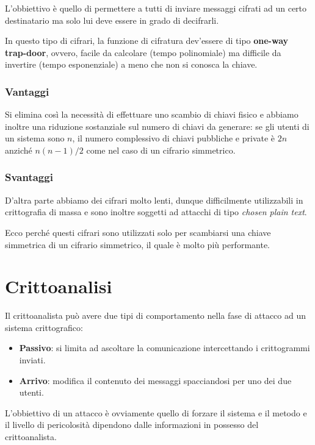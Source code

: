 L'obbiettivo \`e quello di permettere a tutti di inviare messaggi cifrati ad un certo destinatario ma solo lui deve
essere in grado di decifrarli.

In questo tipo di cifrari, la funzione di cifratura dev'essere di tipo \textbf{one-way trap-door}, ovvero, facile da
calcolare (tempo polinomiale) ma difficile da invertire (tempo esponenziale) a meno che non si conosca la chiave.

\subsubsection{Vantaggi}
Si elimina cos\`i la necessit\`a di effettuare uno scambio di chiavi fisico e abbiamo inoltre una riduzione
sostanziale sul numero di chiavi da generare: se gli utenti di un sistema sono $n$, il numero complessivo di chiavi
pubbliche e private \`e $2n$ anzich\'e $n (n-1) / 2$ come nel caso di un cifrario simmetrico.

\subsubsection{Svantaggi}
D'altra parte abbiamo dei cifrari molto lenti, dunque difficilmente utilizzabili in crittografia di massa e sono inoltre
soggetti ad attacchi di tipo \emph{chosen plain text}.

Ecco perch\'e questi cifrari sono utilizzati solo per scambiarsi una chiave simmetrica di un cifrario simmetrico, il
quale \`e molto pi\`u performante.

\section{Crittoanalisi}\label{crittoanalisi}
Il crittoanalista pu\`o avere due tipi di comportamento nella fase di attacco ad un sistema crittografico:
\begin{itemize}
	\item \textbf{Passivo}: si limita ad ascoltare la comunicazione intercettando i crittogrammi inviati.
	\item \textbf{Arrivo}: modifica il contenuto dei messaggi spacciandosi per uno dei due utenti.
\end{itemize}
L'obbiettivo di un attacco \`e ovviamente quello di forzare il sistema e il metodo e il livello di pericolosit\`a
dipendono dalle informazioni in possesso del crittoanalista.

